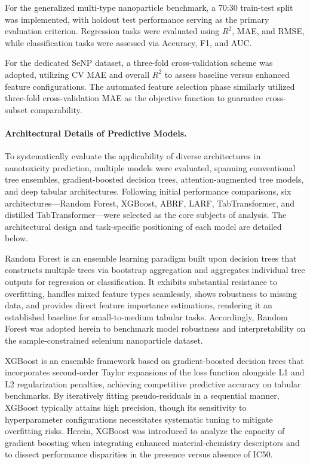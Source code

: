 \documentclass[letterpaper]{article}
\begin{document}
For the generalized multi-type nanoparticle benchmark, a 70:30 train-test split was implemented, with holdout test performance serving as the primary evaluation criterion. Regression tasks were evaluated using $R^2$, MAE, and RMSE, while classification tasks were assessed via Accuracy, F1, and AUC.

For the dedicated SeNP dataset, a three-fold cross-validation scheme was adopted, utilizing CV MAE and overall $R^2$ to assess baseline versus enhanced feature configurations. The automated feature selection phase similarly utilized three-fold cross-validation MAE as the objective function to guarantee cross-subset comparability.

\paragraph{Architectural Details of Predictive Models.}
To systematically evaluate the applicability of diverse architectures in nanotoxicity prediction, multiple models were evaluated, spanning conventional tree ensembles, gradient-boosted decision trees, attention-augmented tree models, and deep tabular architectures. Following initial performance comparisons, six architectures—Random Forest, XGBoost, ABRF, LARF, TabTransformer, and distilled TabTransformer—were selected as the core subjects of analysis. The architectural design and task-specific positioning of each model are detailed below.

Random Forest is an ensemble learning paradigm built upon decision trees that constructs multiple trees via bootstrap aggregation and aggregates individual tree outputs for regression or classification. It exhibits substantial resistance to overfitting, handles mixed feature types seamlessly, shows robustness to missing data, and provides direct feature importance estimations, rendering it an established baseline for small-to-medium tabular tasks. Accordingly, Random Forest was adopted herein to benchmark model robustness and interpretability on the sample-constrained selenium nanoparticle dataset.

XGBoost is an ensemble framework based on gradient-boosted decision trees that incorporates second-order Taylor expansions of the loss function alongside L1 and L2 regularization penalties, achieving competitive predictive accuracy on tabular benchmarks. By iteratively fitting pseudo-residuals in a sequential manner, XGBoost typically attains high precision, though its sensitivity to hyperparameter configurations necessitates systematic tuning to mitigate overfitting risks. Herein, XGBoost was introduced to analyze the capacity of gradient boosting when integrating enhanced material-chemistry descriptors and to dissect performance disparities in the presence versus absence of IC50.
\end{document}

